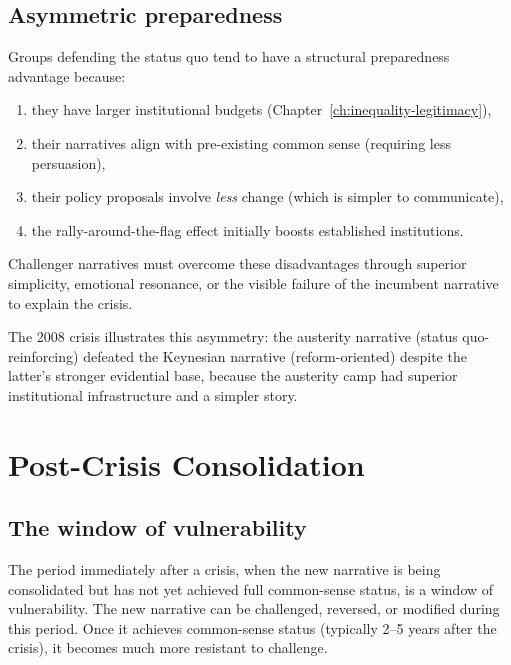 \subsection{Asymmetric preparedness}

\begin{proposition}
\label{prop:conservative-advantage}
Groups defending the status quo tend to have a structural preparedness advantage because:
\begin{enumerate}[nosep]
  \item they have larger institutional budgets (Chapter~\ref{ch:inequality-legitimacy}),
  \item their narratives align with pre-existing common sense (requiring less persuasion),
  \item their policy proposals involve \emph{less} change (which is simpler to communicate),
  \item the rally-around-the-flag effect initially boosts established institutions.
\end{enumerate}
Challenger narratives must overcome these disadvantages through superior simplicity, emotional resonance, or the visible failure of the incumbent narrative to explain the crisis.
\end{proposition}

The 2008 crisis illustrates this asymmetry: the austerity narrative (status quo-reinforcing) defeated the Keynesian narrative (reform-oriented) despite the latter's stronger evidential base, because the austerity camp had superior institutional infrastructure and a simpler story.

\section{Post-Crisis Consolidation}
\label{sec:ch29-consolidation}

\subsection{The window of vulnerability}

The period immediately after a crisis, when the new narrative is being consolidated but has not yet achieved full common-sense status, is a window of vulnerability.
The new narrative can be challenged, reversed, or modified during this period.
Once it achieves common-sense status (typically 2--5 years after the crisis), it becomes much more resistant to challenge.

